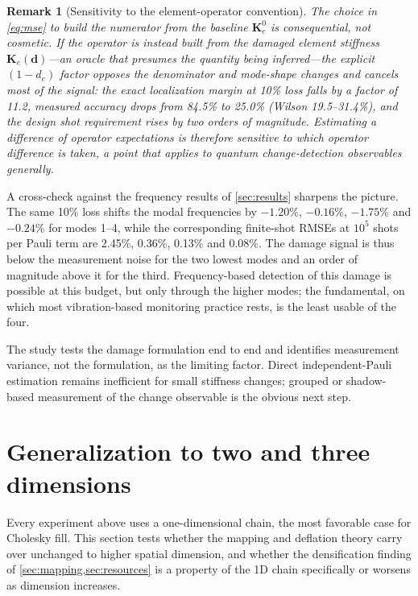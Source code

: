 \documentclass{ieeeaccess}
\newcommand{\K}{\mathbf{K}}
\newtheorem{remark}{Remark}
\begin{document}
\begin{remark}[Sensitivity to the element-operator convention]\label{rem:convention}
The choice in \cref{eq:mse} to build the numerator from the baseline $\K_e^0$ is consequential, not cosmetic. If the operator is instead built from the damaged element stiffness $\K_e(\mathbf d)$---an oracle that presumes the quantity being inferred---the explicit $(1-d_e)$ factor opposes the denominator and mode-shape changes and cancels most of the signal: the exact localization margin at 10\% loss falls by a factor of 11.2, measured accuracy drops from 84.5\% to 25.0\% (Wilson 19.5--31.4\%), and the design shot requirement rises by two orders of magnitude. Estimating a difference of operator expectations is therefore sensitive to which operator difference is taken, a point that applies to quantum change-detection observables generally.
\end{remark}

A cross-check against the frequency results of \cref{sec:results} sharpens the picture. The same 10\% loss shifts the modal frequencies by $-1.20$\%, $-0.16$\%, $-1.75$\% and $-0.24$\% for modes 1--4, while the corresponding finite-shot RMSEs at $10^5$ shots per Pauli term are 2.45\%, 0.36\%, 0.13\% and 0.08\%. The damage signal is thus below the measurement noise for the two lowest modes and an order of magnitude above it for the third. Frequency-based detection of this damage is possible at this budget, but only through the higher modes; the fundamental, on which most vibration-based monitoring practice rests, is the least usable of the four.

The study tests the damage formulation end to end and identifies measurement variance, not the formulation, as the limiting factor. Direct independent-Pauli estimation remains inefficient for small stiffness changes; grouped or shadow-based measurement of the change observable is the obvious next step.

\section{Generalization to two and three dimensions}
\label{sec:dimensions}

Every experiment above uses a one-dimensional chain, the most favorable case for Cholesky fill. This section tests whether the mapping and deflation theory carry over unchanged to higher spatial dimension, and whether the densification finding of \cref{sec:mapping,sec:resources} is a property of the 1D chain specifically or worsens as dimension increases.
\end{document}

